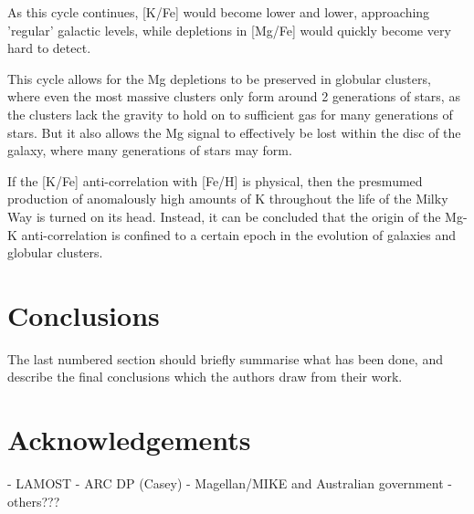 \documentclass[a4paper,fleqn,usenatbib]{mnras}
\begin{document}
As this cycle continues, [K/Fe] would become lower and lower, approaching 'regular' galactic levels, while depletions in [Mg/Fe] would quickly become very hard to detect.

This cycle allows for the Mg depletions to be preserved in globular clusters, where even the most massive clusters only form around 2 generations of stars, as the clusters lack the gravity to hold on to sufficient gas for many generations of stars. But it also allows the Mg signal to effectively be lost within the disc of the galaxy, where many generations of stars may form.

If the [K/Fe] anti-correlation with [Fe/H] is physical, then the presmumed production of anomalously high amounts of K throughout the life of the Milky Way is turned on its head. Instead, it can be concluded that the origin of the Mg-K anti-correlation is confined to a certain epoch in the evolution of galaxies and globular clusters.


\section{Conclusions}

The last numbered section should briefly summarise what has been done, and describe
the final conclusions which the authors draw from their work.

\section*{Acknowledgements}

- LAMOST
- ARC DP (Casey)
- Magellan/MIKE and Australian government
- others???











\appendix
\end{document}

